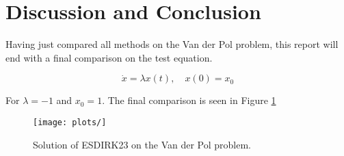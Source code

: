 \section{Discussion and Conclusion}
Having just compared all methods on the Van der Pol problem, this report will end with a final comparison on the test equation.

\begin{equation}
    \dot{x} = \lambda x(t), \quad x(0) = x_0
\end{equation}

For $\lambda = -1$ and $x_0 = 1$. The final comparison is seen in Figure \ref{fig:final}

\begin{figure}[H]
    \centering
    \texttt{[image: plots/]}
    \caption{Solution of ESDIRK23 on the Van der Pol problem.}
    \label{fig:final}
\end{figure}